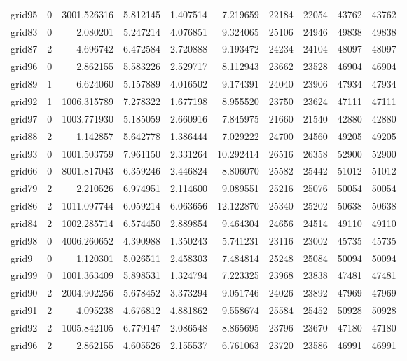\begin{longtable}{|l|r|r|r|r|r|r|r|r|r|}
grid95 & 0 & 3001.526316 & 5.812145 & 1.407514 & 7.219659 & 22184 & 22054 & 43762 & 43762 \\
grid83 & 0 & 2.080201 & 5.247214 & 4.076851 & 9.324065 & 25106 & 24946 & 49838 & 49838 \\
grid87 & 2 & 4.696742 & 6.472584 & 2.720888 & 9.193472 & 24234 & 24104 & 48097 & 48097 \\
grid96 & 0 & 2.862155 & 5.583226 & 2.529717 & 8.112943 & 23662 & 23528 & 46904 & 46904 \\
grid89 & 1 & 6.624060 & 5.157889 & 4.016502 & 9.174391 & 24040 & 23906 & 47934 & 47934 \\
grid92 & 1 & 1006.315789 & 7.278322 & 1.677198 & 8.955520 & 23750 & 23624 & 47111 & 47111 \\
grid97 & 0 & 1003.771930 & 5.185059 & 2.660916 & 7.845975 & 21660 & 21540 & 42880 & 42880 \\
grid88 & 2 & 1.142857 & 5.642778 & 1.386444 & 7.029222 & 24700 & 24560 & 49205 & 49205 \\
grid93 & 0 & 1001.503759 & 7.961150 & 2.331264 & 10.292414 & 26516 & 26358 & 52900 & 52900 \\
grid66 & 0 & 8001.817043 & 6.359246 & 2.446824 & 8.806070 & 25582 & 25442 & 51012 & 51012 \\
grid79 & 2 & 2.210526 & 6.974951 & 2.114600 & 9.089551 & 25216 & 25076 & 50054 & 50054 \\
grid86 & 2 & 1011.097744 & 6.059214 & 6.063656 & 12.122870 & 25340 & 25202 & 50638 & 50638 \\
grid84 & 2 & 1002.285714 & 6.574450 & 2.889854 & 9.464304 & 24656 & 24514 & 49110 & 49110 \\
grid98 & 0 & 4006.260652 & 4.390988 & 1.350243 & 5.741231 & 23116 & 23002 & 45735 & 45735 \\
grid9 & 0 & 1.120301 & 5.026511 & 2.458303 & 7.484814 & 25248 & 25084 & 50094 & 50094 \\
grid99 & 0 & 1001.363409 & 5.898531 & 1.324794 & 7.223325 & 23968 & 23838 & 47481 & 47481 \\
grid90 & 2 & 2004.902256 & 5.678452 & 3.373294 & 9.051746 & 24026 & 23892 & 47969 & 47969 \\
grid91 & 2 & 4.095238 & 4.676812 & 4.881862 & 9.558674 & 25584 & 25452 & 50928 & 50928 \\
grid92 & 2 & 1005.842105 & 6.779147 & 2.086548 & 8.865695 & 23796 & 23670 & 47180 & 47180 \\
grid96 & 2 & 2.862155 & 4.605526 & 2.155537 & 6.761063 & 23720 & 23586 & 46991 & 46991 \\

\end{longtable}
